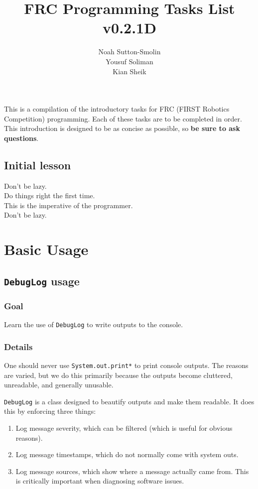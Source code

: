 \documentclass[a4paper]{article}
\title{FRC Programming Tasks List v0.2.1D}
\author{Noah Sutton-Smolin\\Yousuf Soliman\\Kian Sheik}
\begin{document}
\setcounter{tocdepth}{2}\maketitle\tableofcontents\pagebreak

This is a compilation of the introductory tasks for FRC (FIRST Robotics Competition) programming. Each of these tasks are to be completed in order. This introduction is designed to be as concise as possible, so \textbf{be sure to ask questions}.

\subsection{Initial lesson}
Don't be lazy.\\Do things right the first time.\\This is the imperative of the programmer.\\Don't be lazy.

\section{Basic Usage}
\subsection{\lstinline{DebugLog} usage}
\subsubsection{Goal} Learn the use of \lstinline{DebugLog} to write outputs to the console.
\subsubsection{Details} One should never use \lstinline{System.out.print*} to print console outputs. The reasons are varied, but we do this primarily because the outputs become cluttered, unreadable, and generally unusable. 

\lstinline{DebugLog} is a class designed to beautify outputs and make them readable. It does this by enforcing three things:
\begin{enumerate}\item{Log message severity, which can be filtered (which is useful for obvious reasons).}\item{Log message timestamps, which do not normally come with system outs.}\item{Log message sources, which show where a message actually came from. This is critically important when diagnosing software issues.}\end{enumerate}
\end{document}
